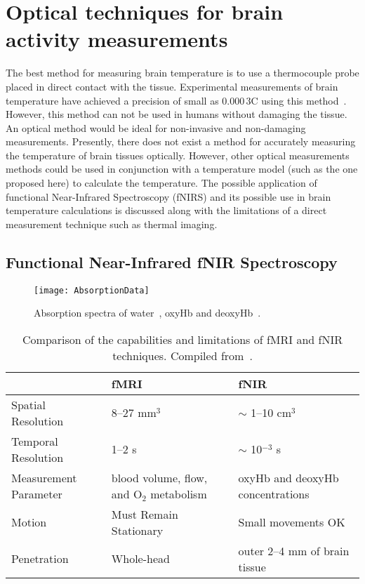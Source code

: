 \chapter{Optical techniques for brain activity measurements}
\label{ch:detectors}
The best method for measuring brain temperature is to use a thermocouple probe placed in direct contact with the tissue.  Experimental measurements of brain temperature have achieved a precision of small as $0.000\,3$\degree C using this method~\citep{mcelligott}. However, this method can not be used in humans without damaging the tissue.  An optical method would be ideal for non-invasive and non-damaging measurements.  Presently, there does not exist a method for accurately measuring the temperature of brain tissues optically.  However, other optical measurements methods could be used in conjunction with a temperature model (such as the one proposed here) to calculate the temperature.  The possible application of functional Near-Infrared Spectroscopy (fNIRS) and its possible use in brain temperature calculations is discussed along with the limitations of a direct measurement technique such as thermal imaging.
  
\section{{F}unctional {N}ear-{I}nfrared {fNIR} Spectroscopy}
\begin{figure}[tb]
  \begin{center}
    \texttt{[image: AbsorptionData]}
    \caption[Absorption spectra of water, deoxyhemoglobin and oxyhemoblogin]{\label{fig:fnirabsorption} Absorption spectra of water~\citet{cope}, oxyHb and deoxyHb~\citet{horecker}.}
  \end{center}
\end{figure}
\begin{table*}[tb]
  \begin{tabular*}{\linewidth}{lp{5cm}p{5cm}}
    \toprule
                         & fMRI             & fNIR            \\
    \midrule
    Spatial Resolution   & 8--27 mm$^3$  & $\sim$ 1--10 cm$^3$ \\
    Temporal Resolution  & 1--2 s        & $\sim$ 10$^{-3}$ s \\
    Measurement Parameter& blood volume, flow, and O$_2$ metabolism & oxyHb and deoxyHb concentrations \\
    Motion               & Must Remain Stationary & Small movements OK \\
    Penetration          & Whole-head    & outer 2--4 mm of brain tissue \\
    \bottomrule
  \end{tabular*}
  \caption[Comparison of fMRI and fNIR]{\label{tbl:comaparemethods}Comparison of the capabilities and limitations of fMRI and fNIR techniques.  Compiled from~\citet{bunce2006,elliott}.}
\end{table*}


